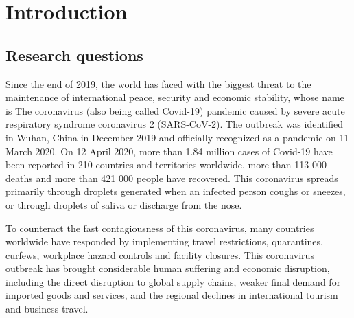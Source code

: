 \documentclass[draft=false
              ,paper=a4
              ,twoside=false
              ,fontsize=12pt
              ,headsepline
              ,BCOR10mm
              ,DIV11
              ]{scrbook}
\begin{document}

\frontmatter




\tableofcontents
{}
\listoffigures
{}
\listoftables
{}
\newpage

\mainmatter
\chapter{Introduction}
\vspace{6pt}
\section{Research questions}
\vspace{6pt}

Since the end of 2019, the world has faced with the biggest threat to the maintenance of international peace, security and economic stability, whose name is  The coronavirus (also being called Covid-19) pandemic caused by severe acute respiratory syndrome coronavirus 2 (SARS-CoV-2). The outbreak was identified in Wuhan, China in December 2019 and officially recognized as a pandemic on 11 March 2020. On 12 April 2020, more than 1.84 million cases of Covid-19 have been reported in 210 countries and territories worldwide, more than 113 000 deaths and more than 421 000 people have recovered. This coronavirus spreads primarily through droplets generated when an infected person coughs or sneezes, or through droplets of saliva or discharge from the nose. 

To counteract the fast contagiousness of this coronavirus, many countries worldwide have responded by implementing travel restrictions, quarantines, curfews, workplace hazard controls and facility closures. This coronavirus outbreak has brought considerable human suffering and economic disruption, including the direct disruption to global supply chains, weaker final demand for imported goods and services, and the regional declines in international tourism and business travel. 
\end{document}
